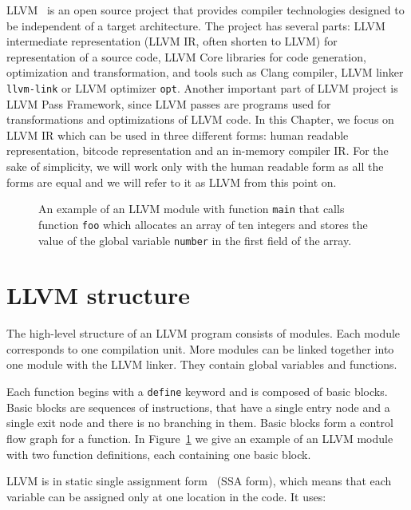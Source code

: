 LLVM~\cite{llvm} is an open source project that provides compiler technologies
designed to be independent of a target architecture. The project has several
parts: LLVM intermediate representation (LLVM IR, often shorten to LLVM) for
representation of a source code, LLVM Core libraries for code generation,
optimization and transformation, and tools such as Clang compiler, LLVM linker
\texttt{llvm-link} or LLVM optimizer \texttt{opt}. Another important part of
LLVM project is LLVM Pass Framework, since LLVM passes are programs used for
transformations and optimizations of LLVM code. In this Chapter, we focus on
LLVM IR which can be used in three different forms: human readable
representation, bitcode representation and an in-memory compiler IR. For the
sake of simplicity, we will work only with the human readable form as all the
forms are equal and we will refer to it as LLVM from this point on.

\begin{figure}[h]
 
 \caption{An example of an LLVM module with function \texttt{main} that calls
 function \texttt{foo} which allocates an array of ten integers and stores the
 value of the global variable \texttt{number} in the first field of the array.}
 \label{fig:llvm_example}
\end{figure}

\section{LLVM structure} %

The high-level structure of an LLVM program consists of modules. Each module
corresponds to one compilation unit. More modules can be linked together into
one module with the LLVM linker. They contain global variables and functions.

Each function begins with a \texttt{define} keyword and is composed of basic
blocks. Basic blocks are sequences of instructions, that have a single entry node
and a single exit node and there is no branching in them. Basic blocks form
a control flow graph for a function. In Figure~\ref{fig:llvm_example} we give
an example of an LLVM module with two function definitions, each containing one
basic block.

LLVM is in static single assignment form~\cite{ssa} (SSA form), which means that each
variable can be assigned only at one location in the code. It uses:

